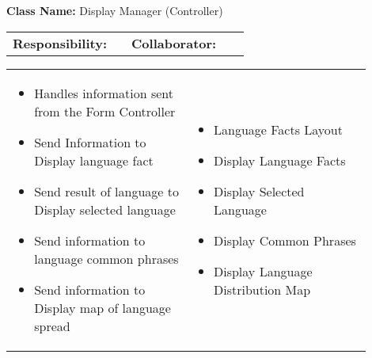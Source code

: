 \begin{cards}[]
    \textbf{Class Name:} Display Manager (Controller)
    \tcbline
    \begin{tabular}{p{0.45\linewidth} | p{0.45\linewidth}}
        \textbf{Responsibility:}& 
        \textbf{Collaborator:}\\
    \end{tabular}
    \tcbline
    \begin{tabular}{p{0.45\linewidth} | p{0.45\linewidth}}
        \begin{itemize}
            \item Handles information sent from the Form Controller
            \item Send Information to Display language fact
            \item Send result of language to Display selected language
            \item Send information to language common phrases
            \item Send information to Display map of language spread
            
        \end{itemize}
        &
        \begin{itemize}
            \item Language Facts Layout
            \item Display Language Facts
            \item Display Selected Language
            \item Display Common Phrases
            \item Display Language Distribution Map

        \end{itemize}
    \end{tabular}
\end{cards}